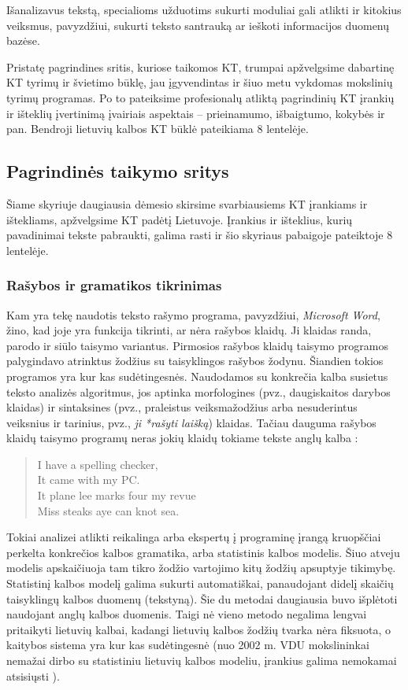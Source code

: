 \documentclass[]{../metanetpaper}
\begin{document}
\begin{multicols}{2}
Išanalizavus tekstą, specialioms užduotims sukurti moduliai gali atlikti ir kitokius veiksmus, pavyzdžiui, sukurti teksto santrauką ar ieškoti informacijos duomenų bazėse.
 
Pristatę pagrindines sritis, kuriose taikomos KT, trumpai apžvelgsime dabartinę KT tyrimų ir švietimo būklę, jau įgyvendintas ir šiuo metu vykdomas mokslinių tyrimų programas. Po to pateiksime profesionalų atliktą pagrindinių KT įrankių ir išteklių įvertinimą įvairiais aspektais – prieinamumo, išbaigtumo, kokybės ir pan. Bendroji lietuvių kalbos KT būklė pateikiama 8 lentelėje.

\subsection{Pagrindinės taikymo sritys} 

Šiame skyriuje daugiausia dėmesio skirsime svarbiausiems KT įrankiams ir ištekliams, apžvelgsime KT padėtį Lietuvoje. Įrankius ir išteklius, kurių pavadinimai tekste pabraukti, galima rasti ir šio skyriaus pabaigoje pateiktoje 8 lentelėje. 

\subsubsection{Rašybos ir gramatikos tikrinimas}

Kam yra tekę naudotis teksto rašymo programa, pavyzdžiui, \textit{Microsoft Word}, žino, kad joje yra funkcija tikrinti, ar nėra rašybos klaidų. Ji klaidas randa, parodo ir siūlo taisymo variantus. Pirmosios rašybos klaidų taisymo programos palygindavo atrinktus žodžius su taisyklingos rašybos žodynu. Šiandien tokios programos yra kur kas sudėtingesnės. Naudodamos su konkrečia kalba susietus teksto analizės algoritmus, jos aptinka morfologines (pvz., daugiskaitos darybos klaidas) ir sintaksines (pvz., praleistus veiksmažodžius arba nesuderintus veiksnius ir tarinius, pvz., \textit{ji *rašyti laišką}) klaidas. Tačiau dauguma rašybos klaidų taisymo programų neras jokių klaidų tokiame tekste anglų kalba \cite{zar1}:

\begin{quote}
  I have a spelling checker,\\
  It came with my PC.\\
  It plane lee marks four my revue\\
  Miss steaks aye can knot sea.
\end{quote}

Tokiai analizei atlikti reikalinga arba ekspertų į programinę įrangą kruopščiai perkelta konkrečios kalbos gramatika, arba statistinis kalbos modelis. Šiuo atveju modelis apskaičiuoja tam tikro žodžio vartojimo kitų žodžių apsuptyje tikimybę. Statistinį kalbos modelį galima sukurti automatiškai, panaudojant didelį skaičių taisyklingų kalbos duomenų (tekstyną). Šie du metodai daugiausia buvo išplėtoti naudojant anglų kalbos duomenis. Taigi nė vieno metodo negalima lengvai pritaikyti lietuvių kalbai, kadangi lietuvių kalbos žodžių tvarka nėra fiksuota, o kaitybos sistema yra kur kas sudėtingesnė (nuo 2002 m. VDU mokslininkai nemažai dirbo su statistiniu lietuvių kalbos modeliu, įrankius galima nemokamai atsisiųsti \cite{airenas}).   


\end{multicols}
\end{document}
